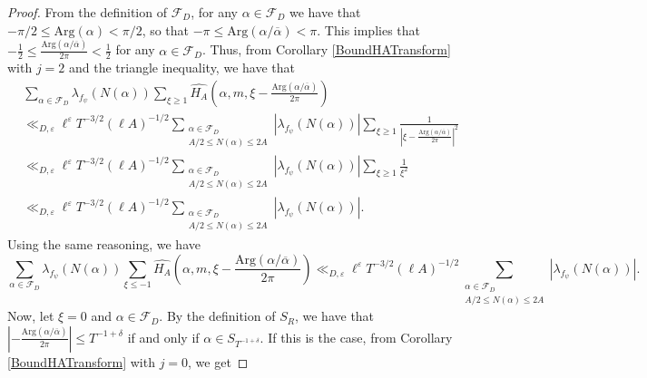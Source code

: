 \documentclass[10pt,a4paper]{amsart}
\begin{document}
\begin{proof}
From the definition of $\mathcal{F}_{D}$, for any $\alpha \in \mathcal{F}_{D}$ we have that $-\pi/2 \leq \mathrm{Arg}(\alpha) < \pi/2$, so that $-\pi \leq \mathrm{Arg}(\alpha/\overline{\alpha}) < \pi$. This implies that $-\frac{1}{2} \leq \frac{\mathrm{Arg}(\alpha / \overline{\alpha})}{2\pi} < \frac{1}{2}$ for any $\alpha \in \mathcal{F}_{D}$. Thus, from Corollary \ref{BoundHATransform} with $j=2$ and the triangle inequality, we have that
\begin{align}
    &\sum_{\alpha \in \mathcal{F}_{D}} \lambda_{f_{\psi}}(N(\alpha)) \sum_{\xi\geq 1} \widehat{H_A}\left( \alpha,m,\xi-\frac{\mathrm{Arg}(\alpha/\overline{\alpha})}{2 \pi} \right) \label{BoundInnerSumsSa-1} \\
    &\ll_{D,\varepsilon} \ell^{\varepsilon} T^{-3/2} (\ell A)^{-1/2} \sum_{\substack{\alpha \in \mathcal{F}_{D} \\ A/2 \leq N(\alpha) \leq 2A}} |\lambda_{f_{\psi}}(N(\alpha))| \sum_{\xi\geq 1} \frac{1}{\left| \xi - \frac{\mathrm{Arg}(\alpha/\overline{\alpha})}{2 \pi} \right|^2} \nonumber \\
    &\ll_{D,\varepsilon} \ell^{\varepsilon} T^{-3/2} (\ell A)^{-1/2} \sum_{\substack{\alpha \in \mathcal{F}_{D} \\ A/2 \leq N(\alpha) \leq 2A}} |\lambda_{f_{\psi}}(N(\alpha))| \sum_{\xi\geq 1} \frac{1}{\xi^2} \nonumber \\
    &\ll_{D,\varepsilon} \ell^{\varepsilon} T^{-3/2} (\ell A)^{-1/2} \sum_{\substack{\alpha \in \mathcal{F}_{D} \\ A/2 \leq N(\alpha) \leq 2A}} |\lambda_{f_{\psi}}(N(\alpha))|. \nonumber
\end{align}
Using the same reasoning, we have
\begin{equation}
    \sum_{\alpha \in \mathcal{F}_{D}} \lambda_{f_{\psi}}(N(\alpha)) \sum_{\xi\leq -1} \widehat{H_A}\left( \alpha,m,\xi-\frac{\mathrm{Arg}(\alpha/\overline{\alpha})}{2 \pi} \right) \ll_{D,\varepsilon} \ell^{\varepsilon} T^{-3/2} (\ell A)^{-1/2} \sum_{\substack{\alpha \in \mathcal{F}_{D} \\ A/2 \leq N(\alpha) \leq 2A}} |\lambda_{f_{\psi}}(N(\alpha))|. \label{BoundInnerSumsSa-2}
\end{equation}
Now, let $\xi = 0$ and $\alpha \in \mathcal{F}_{D}$. By the definition of $S_{R}$, we have that $\left|-\frac{\mathrm{Arg}(\alpha/\overline{\alpha})}{2 \pi} \right| \leq T^{-1+\delta}$ if and only if $\alpha \in S_{T^{-1+\delta}}$. If this is the case, from Corollary \ref{BoundHATransform} with $j=0$, we get 

\end{proof}
\end{document}
